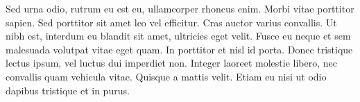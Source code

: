 \documentclass[../00_main.tex]{subfiles}
\begin{document}
Sed urna odio, rutrum eu est eu, ullamcorper rhoncus enim. Morbi vitae porttitor sapien. Sed porttitor sit amet leo vel efficitur. Cras auctor varius convallis. Ut nibh est, interdum eu blandit sit amet, ultricies eget velit. Fusce eu neque et sem malesuada volutpat vitae eget quam. In porttitor et nisl id porta. Donec tristique lectus ipsum, vel luctus dui imperdiet non. Integer laoreet molestie libero, nec convallis quam vehicula vitae. Quisque a mattis velit. Etiam eu nisi ut odio dapibus tristique et in purus.
\end{document}
